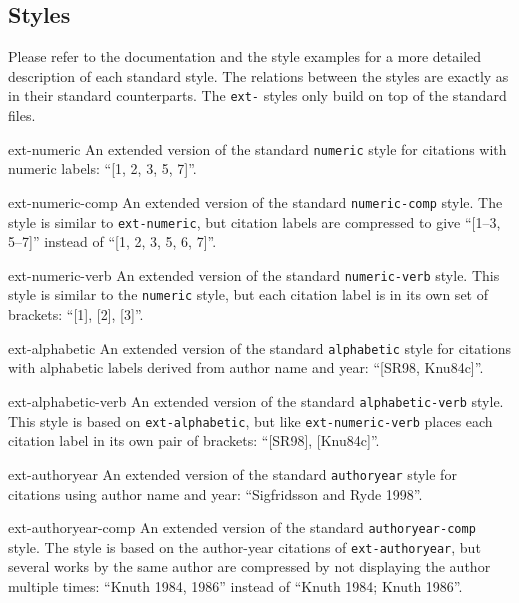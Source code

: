 \documentclass{ltxdockit}
\begin{document}
\subsection{Styles}
Please refer to the  documentation%
and the style examples%
for a more detailed description of each standard style.
The relations between the styles are exactly as in their standard counterparts.
The \texttt{ext-} styles only build on top of the standard files.
\begin{marglist}
\item[ext-numeric]
An extended version of the standard \texttt{numeric} style for citations with
numeric labels: \enquote{[1, 2, 3, 5, 7]}.

\item[ext-numeric-comp]
An extended version of the standard \texttt{numeric-comp} style.
The style is similar to \texttt{ext-numeric}, but citation labels are
compressed to give \enquote{[1--3, 5--7]} instead of
\enquote{[1, 2, 3, 5, 6, 7]}.

\item[ext-numeric-verb]
An extended version of the standard \texttt{numeric-verb} style.
This style is similar to the \texttt{numeric} style, but each citation label
is in its own set of brackets: \enquote{[1], [2], [3]}.

\item[ext-alphabetic]
An extended version of the standard \texttt{alphabetic} style for citations with
alphabetic labels derived from author name and year: \enquote{[SR98, Knu84c]}.

\item[ext-alphabetic-verb]
An extended version of the standard \texttt{alphabetic-verb} style.
This style is based on \texttt{ext-alphabetic}, but like
\texttt{ext-numeric-verb} places each citation label in its own pair of
brackets: \enquote{[SR98], [Knu84c]}.

\item[ext-authoryear]
An extended version of the standard \texttt{authoryear} style for citations
using author name and year: \enquote{Sigfridsson and Ryde 1998}.

\item[ext-authoryear-comp]
An extended version of the standard \texttt{authoryear-comp} style.
The style is based on the author-year citations of \texttt{ext-authoryear},
but several works by the same author are compressed by not displaying the
author multiple times: \enquote{Knuth 1984, 1986} instead of
\enquote{Knuth 1984; Knuth 1986}.


\end{marglist}
\end{document}
